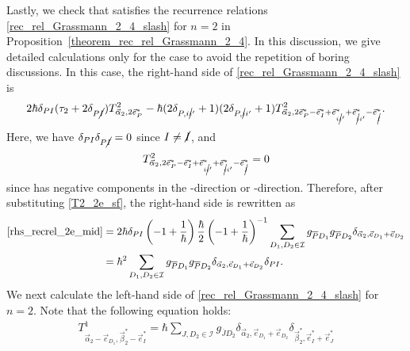 \documentclass[10pt,a4paper]{amsart}
\numberwithin{equation}{section}
\begin{document}
Lastly, we check that
 satisfies the recurrence relations \eqref{rec_rel_Grassmann_2_4_slash} for $n=2$ in
Proposition~\ref{theorem_rec_rel_Grassmann_2_4}. In this discussion, we give
detailed calculations
only for the case
to avoid the repetition of boring discussions. In this case, the right-hand side of \eqref{rec_rel_Grassmann_2_4_slash} is
\begin{align}
2
\hbar
\delta_{PI}
 (
\tau_{2}
+
2
\delta_{P\cancel{I}}
 )
T^{2}_{\vec{\alpha}_{2},
2
\vec{e}_{P}^{\ast}
}
-
\hbar
 (
2
\delta_{P,i\cancel{i}'}
+
1
 )
 (
2
\delta_{P,\cancel{i}i'}
+
1
 )
T^{2}_{\vec{\alpha}_{2},
2
\vec{e}_{P}^{\ast}
-
\vec{e}_{I}^{\ast}
+
\vec{e}_{i\cancel{i}'}^{\ast}
+
\vec{e}_{\cancel{i}i'}^{\ast}
-
\vec{e}_{\cancel{I}}^{\ast}
}
.
\label{rhs_recrel_2e_mid}
\end{align}
Here,
we have
$
\delta_{PI}
\delta_{P\cancel{I}}
=
0
$
since
$
I
\neq
\cancel{I}
$,
and
\[
T^{2}_{\vec{\alpha}_{2},
2
\vec{e}_{P}^{\ast}
-
\vec{e}_{I}^{\ast}
+
\vec{e}_{i\cancel{i}'}^{\ast}
+
\vec{e}_{\cancel{i}i'}^{\ast}
-
\vec{e}_{\cancel{I}}^{\ast}
}
=
0
\]
since
has negative components
in the -direction or -direction.
Therefore, after substituting \eqref{T2_2e_sf}, the right-hand side is rewritten as
\begin{align}
\eqref{rhs_recrel_2e_mid}
={}&
2
\hbar
\delta_{PI}
 \left(
-1
+
\frac{1}{\hbar}
 \right)
\frac{\hbar}{2}
 \left(
-1
+
\frac{1}{\hbar}
 \right)^{-1}
\sum_{
D_{1},D_{2}
\in
\mathcal{I}
}
g_{\overline{P}D_{1}}
g_{\overline{P}D_{2}}
\delta_{
\vec{\alpha}_{2},
\vec{e}_{D_{1}}
+
\vec{e}_{D_{2}}
}
\nonumber
\\
={}&
\hbar^{2}
\sum_{
D_{1},D_{2}
\in
\mathcal{I}
}
g_{\overline{P}D_{1}}
g_{\overline{P}D_{2}}
\delta_{
\vec{\alpha}_{2},
\vec{e}_{D_{1}}
+
\vec{e}_{D_{2}}
}
\delta_{PI}
.
\label{rhs_recrel_2e}
\end{align}
We next calculate the left-hand side of \eqref{rec_rel_Grassmann_2_4_slash} for $n=2$. Note that the following equation holds:
\begin{align*}
T^{1}_{
\vec{\alpha}_{2}
-
\vec{e}_{D_{1}}
,
\vec{\beta}_{2}^{\ast}
-
\vec{e}_{I}^{\ast}
}
=
\hbar
\sum_{
J,D_{2}
\in
\mathcal{I}
}
g_{\overline{J}D_{2}}
\delta_{
\vec{\alpha}_{2},
\vec{e}_{D_{1}}
+
\vec{e}_{D_{2}}
}
\delta_{
\vec{\beta}_{2}^{\ast},
\vec{e}_{I}^{\ast}
+
\vec{e}_{J}^{\ast}
}
\end{align*}
\end{document}

